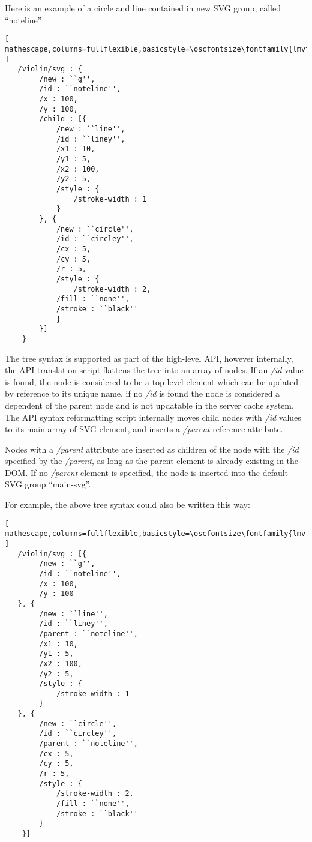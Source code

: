 Here is an example of a circle and line contained in new SVG group, called ``noteline'':

\begin{lstlisting}[ mathescape,columns=fullflexible,basicstyle=\oscfontsize\fontfamily{lmvtt}\selectfont ]
   /violin/svg : {
        /new : ``g'',
        /id : ``noteline'',
        /x : 100,
        /y : 100,
        /child : [{
      	    /new : ``line'',
            /id : ``liney'',
      	    /x1 : 10,
      	    /y1 : 5,
      	    /x2 : 100,
      	    /y2 : 5,
      	    /style : {
      	        /stroke-width : 1
      	    }
      	}, {
      	    /new : ``circle'',
            /id : ``circley'',
      	    /cx : 5,
      	    /cy : 5,
      	    /r : 5,
      	    /style : {
      	        /stroke-width : 2,
      		/fill : ``none'',
      		/stroke : ``black''
      	    }
        }]
    }
\end{lstlisting}

The tree syntax is supported as part of the high-level API, however internally, the API translation script flattens the tree into an array of nodes. 
If an \textit{/id} value is found, the node is considered to be a top-level element which can be updated by reference to its unique name, if no \textit{/id} is found the node is considered a dependent of the parent node and is not updatable in the server cache system.
The API syntax reformatting script internally moves child nodes with \textit{/id} values to its main array of SVG element, and inserts a \textit{/parent} reference attribute.

Nodes with a \textit{/parent} attribute are inserted as children of the node with the \textit{/id} specified by the \textit{/parent}, as long as the parent element is already existing in the DOM.
If no \textit{/parent} element is specified, the node is inserted into the default SVG group ``main-svg''.

\begin{minipage}{\linewidth}
For example, the above tree syntax could also be written this way:

\begin{lstlisting}[ mathescape,columns=fullflexible,basicstyle=\oscfontsize\fontfamily{lmvtt}\selectfont ]
   /violin/svg : [{
        /new : ``g'',
        /id : ``noteline'',
        /x : 100,
        /y : 100
   }, {
        /new : ``line'',
        /id : ``liney'',
        /parent : ``noteline'',
        /x1 : 10,
        /y1 : 5,
        /x2 : 100,
        /y2 : 5,
        /style : {
            /stroke-width : 1
      	}
   }, {
        /new : ``circle'',
        /id : ``circley'',
        /parent : ``noteline'',
        /cx : 5,
        /cy : 5,
        /r : 5,
        /style : {
            /stroke-width : 2,
            /fill : ``none'',
            /stroke : ``black''
        }
    }]
\end{lstlisting}
\end{minipage}


